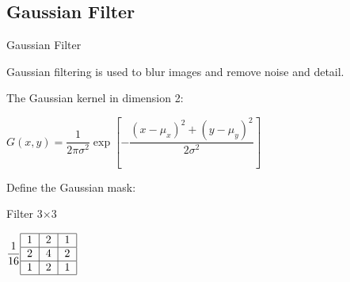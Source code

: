 \documentclass{beamer}
\begin{document}
\subsection{Gaussian Filter}
\begin{frame}{Gaussian Filter}

Gaussian filtering is used to blur images and remove noise and detail.
\vspace{1.5cm}

The Gaussian kernel in dimension 2:


$G(x,y) = \dfrac{1}{2\pi\sigma^2}\exp\left[-\dfrac{(x-\mu_x)^2+(y-\mu_y)^2}{2\sigma^2}\right ]$

	

\vspace{1cm}

Define the Gaussian mask:
\begin{center}
	Filter 3$\times$3
	
	$\dfrac{1}{16}\begin{tabular}{|c|c|c|}
	\hline 
	1 & 2 & 1 \\ 
	\hline 
	2 & 4 & 2 \\ 
	\hline 
	1 & 2 & 1 \\ 
	\hline 
	\end{tabular} $
\end{center}
\end{frame}
\end{document}
